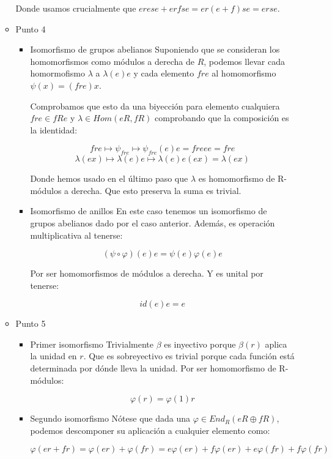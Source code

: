 \documentclass[11pt]{article}
\begin{document}
\begin{itemize}
\begin{itemize}
Donde usamos crucialmente que $erese+erfse=er(e+f)se=erse$.

\item Punto 4
\label{sec-7-4-3-1-4}
\begin{itemize}
\item Isomorfismo de grupos abelianos
\label{sec-7-4-3-1-4-1}
Suponiendo que se consideran los homomorfismos como módulos a derecha
de $R$, podemos llevar cada homormofismo $\lambda$ a $\lambda(e)e$ y cada elemento $fre$
al homomorfismo $\psi(x) = (fre)x$.

Comprobamos que esto da una biyección para elemento cualquiera $fre \in fRe$
y $\lambda \in Hom(eR,fR)$ comprobando que la composición es la identidad:

\[
fre \mapsto \psi_{fre} \mapsto \psi_{fre}(e)e = freee = fre
\]
\[
\lambda(ex) \mapsto \lambda(e)e \mapsto \lambda(e)e(ex) = \lambda(ex)
\]

Donde hemos usado en el último paso que $\lambda$ es homomorfismo de R-módulos
a derecha. Que esto preserva la suma es trivial.

\item Isomorfismo de anillos
\label{sec-7-4-3-1-4-2}
En este caso tenemos un isomorfismo de grupos abelianos dado por el
caso anterior. Además, es operación multiplicativa al tenerse:

\[
(\psi\circ\varphi)(e)e = \psi(e)\varphi(e)e
\]

Por ser homomorfismos de módulos a derecha. Y es unital por tenerse:

\[
id(e)e = e
\]
\end{itemize}

\item Punto 5
\label{sec-7-4-3-1-5}
\begin{itemize}
\item Primer isomorfismo
\label{sec-7-4-3-1-5-1}
Trivialmente $\beta$ es inyectivo porque $\beta(r)$ aplica la unidad en $r$.
Que es sobreyectivo es trivial porque cada función está determinada
por dónde lleva la unidad. Por ser homomorfismo de R-módulos:

\[
\varphi(r) = \varphi(1)r
\]

\item Segundo isomorfismo
\label{sec-7-4-3-1-5-2}
Nótese que dada una $\varphi \in End_R(eR\oplus fR)$, podemos descomponer su aplicación
a cualquier elemento como:

\[
\varphi(er+fr) = \varphi(er)+\varphi(fr) = e\varphi(er)+f\varphi(er)+
e\varphi(fr)+f\varphi(fr)
\]


\end{itemize}
\end{itemize}
\end{itemize}
\end{document}

